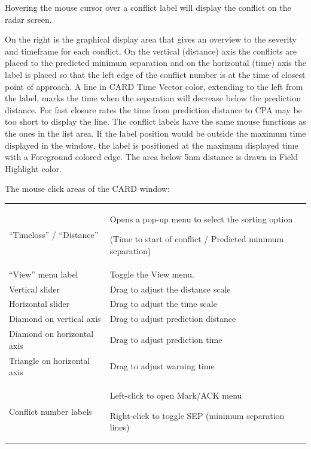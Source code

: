 \documentclass[a4paper,oneside,11pt]{memoir}
\newcommand{\colorref}[1]{\colorbox{Flight Highlight}{\color{#1}#1}}
\begin{document}
\bigskip

Hovering the mouse cursor over a conflict label will display the conflict on the radar screen.

\bigskip

On the right is the graphical display area that gives an overview to the severity and timeframe for each conflict. On the vertical (distance) axis the conflicts are placed to the predicted minimum separation and on the horizontal (time) axis the label is placed so that the left edge of the conflict number is at the time of closest point of approach. A line in \colorref{CARD Time Vector} color, extending to the left from the label, marks the time when the separation will decrease below the prediction distance. For fast closure rates the time from prediction distance to CPA may be too short to display the line. The conflict labels have the same mouse functions as the ones in the list area. If the label position would be outside the maximum time displayed in the window, the label is positioned at the maximum displayed time with a \colorref{Foreground} colored edge.
The area below 5nm distance is drawn in \colorref{Field Highlight} color.

\bigskip

The mouse click areas of the CARD window:

\bigskip

\begin{longtable}{p{5.5cm} p{7cm}}
    “Timeloss” / “Distance”     & Opens a pop-up menu to select the sorting option
                                  
                                  (Time to start of conflict / Predicted minimum separation)\\
    “View” menu label           & Toggle the View menu.\\
    Vertical slider             & Drag to adjust the distance scale\\
    Horizontal slider           & Drag to adjust the time scale\\
    Diamond on vertical axis    & Drag to adjust prediction distance    \\
    Diamond on horizontal axis  & Drag to adjust prediction time\\
    Triangle on horizontal axis & Drag to adjust warning time\\
    Conflict number labels      & Left-click to open Mark/ACK menu
                                  
                                  Right-click to toggle SEP (minimum separation lines)\\
\end{longtable}
\end{document}
